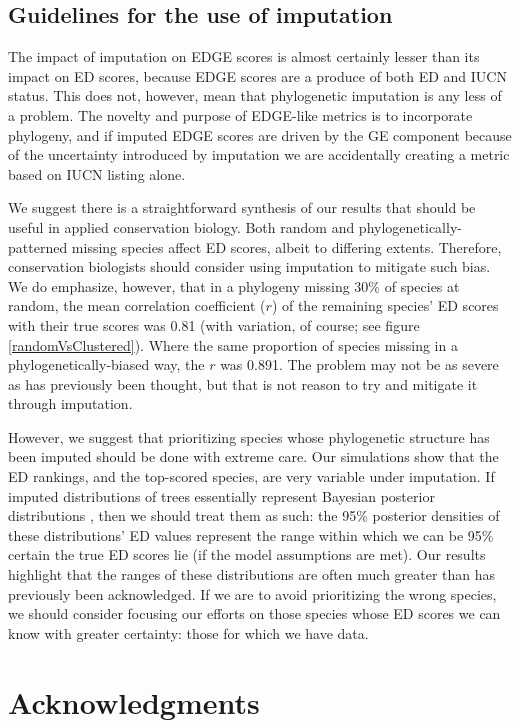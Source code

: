 \documentclass[12pt,english]{article}
\begin{document}
\subsection*{Guidelines for the use of imputation}
The impact of imputation on EDGE scores is almost certainly lesser than its
impact on ED scores, because EDGE scores are a produce of both ED and IUCN
status. This does not, however, mean that phylogenetic imputation is any less of
a problem. The novelty and purpose of EDGE-like metrics is to incorporate
phylogeny, and if imputed EDGE scores are driven by the GE component because of
the uncertainty introduced by imputation we are accidentally creating a metric
based on IUCN listing alone.

We suggest there is a straightforward synthesis of our results that should be
useful in applied conservation biology. Both random and
phylogenetically-patterned missing species affect ED scores, albeit to differing
extents.  Therefore, conservation biologists should consider using imputation to
mitigate such bias.  We do emphasize, however, that in a phylogeny missing 30\%
of species at random, the mean correlation coefficient ($r$) of the remaining
species' ED scores with their true scores was 0.81 (with variation, of course;
see figure \ref{randomVsClustered}). Where the same proportion of species
missing in a phylogenetically-biased way, the $r$ was 0.891. The problem may not
be as severe as has previously been thought, but that is not reason to try and
mitigate it through imputation.

However, we suggest that prioritizing species whose phylogenetic structure has
been imputed should be done with extreme care. Our simulations show that the ED
rankings, and the top-scored species, are very variable under imputation. If
imputed distributions of trees essentially represent Bayesian posterior
distributions \autocite{Kuhn2011}, then we should treat them as such: the 95\%
posterior densities of these distributions' ED values represent the range within
which we can be 95\% certain the true ED scores lie (if the model assumptions
are met). Our results highlight that the ranges of these distributions are often
much greater than has previously been acknowledged. If we are to avoid
prioritizing the wrong species, we should consider focusing our efforts on those
species whose ED scores we can know with greater certainty: those for which we
have data.

\section*{Acknowledgments}
\end{document}
